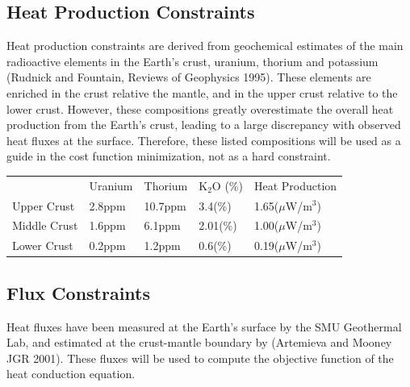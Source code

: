 \documentclass[a4paper,10pt]{article}
\begin{document}
\subsection{Heat Production Constraints} 
  
 Heat production constraints are derived from geochemical estimates of the main radioactive elements in the Earth's crust, uranium, thorium and potassium  (Rudnick and Fountain, Reviews of Geophysics 1995). These elements are enriched in the crust relative the mantle, and in the upper crust relative to the lower crust. However, these compositions greatly overestimate the overall heat production from the Earth's crust, leading to a large discrepancy with observed heat fluxes at the surface.  Therefore, these listed compositions will be used as a guide in the cost function minimization, not as a hard constraint.   \\
 
\centering
\label{my-label}
\begin{tabular}{lllll}
             & Uranium & Thorium & K$_2$O (\%) & Heat Production  \\
Upper Crust  & 2.8ppm           & 10.7ppm          & 3.4(\%)          & 1.65($\mu$W/m$^3$)\\
Middle Crust & 1.6ppm           & 6.1ppm           & 2.01(\%)         & 1.00($\mu$W/m$^3$) \\
Lower Crust  & 0.2ppm           & 1.2ppm           & 0.6(\%)          & 0.19($\mu$W/m$^3$)                          
\end{tabular}
 
\subsection{Flux Constraints}
 
 \justify
 
Heat fluxes have been measured at the Earth's surface by the SMU Geothermal Lab, and estimated at the crust-mantle boundary by (Artemieva and Mooney JGR 2001).  These fluxes will be used to compute the objective function  of the heat conduction equation.  
  
\end{document}
